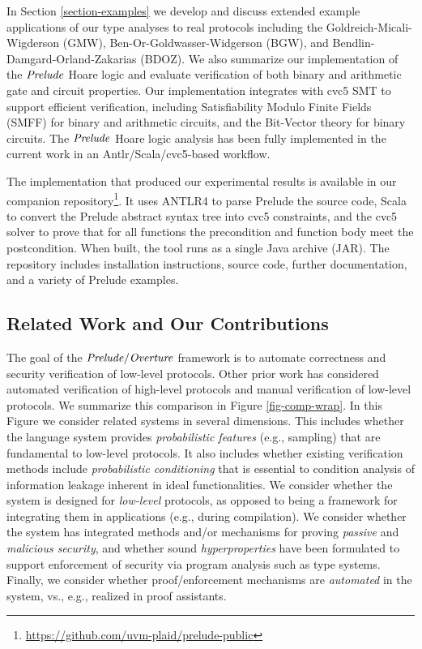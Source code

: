 In Section \ref{section-examples} we develop and discuss extended
example applications of our type analyses to real protocols including
the Goldreich-Micali-Wigderson (GMW), Ben-Or-Goldwasser-Widgerson
(BGW), and Bendlin-Damgard-Orland-Zakarias (BDOZ). We also summarize
our implementation of the $\mathit{Prelude}$ Hoare logic and evaluate
verification of both binary and arithmetic gate and circuit
properties. Our implementation integrates with cvc5 SMT to support
efficient verification, including Satisfiability Modulo Finite Fields
(SMFF) \cite{SMFF} for binary and arithmetic circuits, and the
Bit-Vector theory for binary circuits. The $\mathit{Prelude}$ Hoare logic
analysis has been fully implemented in the current work in an
Antlr/Scala/cvc5-based workflow.

The implementation that produced our experimental results is available in our
companion
repository\footnote{\url{https://github.com/uvm-plaid/prelude-public}}. It uses
ANTLR4 to parse Prelude the source code, Scala to convert the Prelude abstract
syntax tree into cvc5 constraints, and the cvc5 solver to prove that for all
functions the precondition and function body meet the postcondition. When
built, the tool runs as a single Java archive (JAR). The repository includes
installation instructions, source code, further documentation, and a variety of
Prelude examples.


\subsection{Related Work and Our Contributions}
\label{section-related-work}

\compwrapfig

The goal of the $\mathit{Prelude}/\mathit{Overture}$ framework is to automate
correctness and security verification of low-level protocols.  Other
prior work has considered automated verification of high-level
protocols and manual verification of low-level protocols.  We
summarize this comparison in Figure \ref{fig-comp-wrap}.  In this
Figure we consider related systems in several dimensions.  This
includes whether the language system provides \emph{probabilistic
features} (e.g., sampling) that are fundamental to low-level
protocols. It also includes whether existing verification methods
include \emph{probabilistic conditioning} that is essential to
condition analysis of information leakage inherent in ideal
functionalities. We consider whether the system is designed for
\emph{low-level} protocols, as opposed to being a framework for
integrating them in applications (e.g., during compilation). We
consider whether the system has integrated methods and/or mechanisms
for proving \emph{passive} and \emph{malicious security}, and whether
sound \emph{hyperproperties} have been formulated to support
enforcement of security via program analysis such as type systems.
Finally, we consider whether proof/enforcement mechanisms are
\emph{automated} in the system, vs., e.g., realized in proof
assistants.

